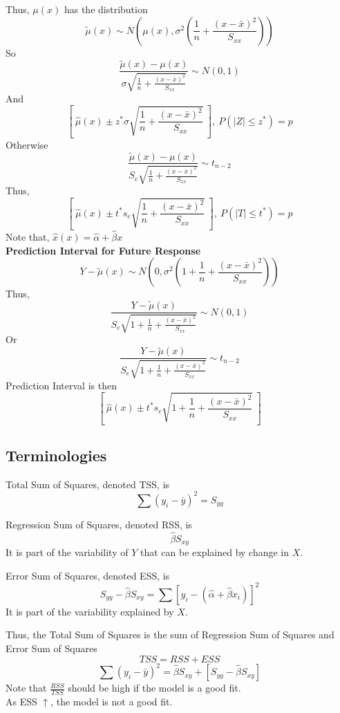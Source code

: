 \documentclass[12pt, leqno]{article}
\theoremstyle{definition}
\begin{document}
  Thus, $\mu(x)$ has the distribution
  $$\widetilde{\mu}(x) \sim N\left(\mu(x), \sigma^{2}\left(\frac{1}{n} + \frac{(x - \bar{x})^{2}}{S_{xx}}\right)\right)$$
  So
  $$\frac{\widetilde{\mu}(x) - \mu(x)}{\sigma\sqrt{\frac{1}{n} + \frac{(x - \bar{x})^{2}}{S_{xx}}}} \sim N(0, 1)$$
  And
  $$\left[~\hat{\mu}(x) \pm z^{*}\sigma\sqrt{\frac{1}{n} + \frac{(x - \bar{x})^{2}}{S_{xx}}}~\right], ~P(|Z| \leq z^{*}) = p$$
  \newline
  Otherwise
  $$\frac{\widetilde{\mu}(x) - \mu(x)}{S_{e}\sqrt{\frac{1}{n} + \frac{(x - \bar{x})^{2}}{S_{xx}}}} \sim t_{n-2}$$
  Thus,
  $$\left[~\hat{\mu}(x) \pm t^{*}s_{e}\sqrt{\frac{1}{n} + \frac{(x - \bar{x})^{2}}{S_{xx}}}~\right], ~P(|T| \leq t^{*}) = p$$
  \newline
  Note that, $\hat{x}(x) = \hat{\alpha} + \hat{\beta}x$ \\
  \newline
  \textbf{Prediction Interval for Future Response} \\
  $$Y - \widetilde{\mu}(x) \sim N\left(0, \sigma^{2}\left(1 + \frac{1}{n} + \frac{(x - \bar{x})^{2}}{S_{xx}}\right)\right)$$
  Thus,
  $$\frac{Y - \widetilde{\mu}(x)}{S_{e}\sqrt{1 + \frac{1}{n} + \frac{(x - \bar{x})^{2}}{S_{xx}}}} \sim N(0, 1)$$
  Or
  $$\frac{Y - \widetilde{\mu}(x)}{S_{e}\sqrt{1 + \frac{1}{n} + \frac{(x - \bar{x})^{2}}{S_{xx}}}} \sim t_{n-2}$$
  \newline
  Prediction Interval is then
  $$\left[~\hat{\mu}(x) \pm t^{*}s_{e}\sqrt{1 + \frac{1}{n} + \frac{(x - \bar{x})^{2}}{S_{xx}}} ~\right]$$

  \subsection{Terminologies}
  Total Sum of Squares, denoted TSS, is
  $$\sum (y_{i} - \bar{y})^{2} = S_{yy}$$

  Regression Sum of Squares, denoted RSS, is
  $$\hat{\beta}S_{xy}$$
  It is part of the variability of $Y$ that can be explained by change in $X$.

  Error Sum of Squares, denoted ESS, is
  $$S_{yy} - \hat{\beta}S_{xy} = \sum [y_{i} - (\hat{\alpha} + \hat{\beta}x_{i})]^{2}$$
  It is part of the variability explained by $X$.

  Thus, the Total Sum of Squares is the sum of Regression Sum of Squares and Error Sum of Squares
  $$TSS = RSS + ESS$$
  $$\sum (y_{i} - \bar{y})^{2} = \hat{\beta}S_{xy} + [S_{yy} - \hat{\beta}S_{xy}]$$
  Note that $\frac{RSS}{TSS}$ should be high if the model is a good fit. \\
  As ESS $\uparrow$, the model is not a good fit.
\end{document}
